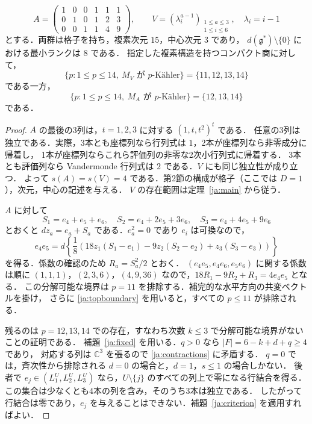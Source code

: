\documentclass[12pt]{amsart}
\theoremstyle{definition}
\theoremstyle{remark}
\numberwithin{equation}{section}
\newcommand{\C}{\mathbb{C}}
\newcommand{\gfr}{\mathfrak g}
\begin{document}
\begin{jprop}\label{ja:counter}
\begin{equation}\label{ja:counterA}
 A=\begin{pmatrix}
 1&0&0&1&1&1\\
 0&1&0&1&2&3\\
 0&0&1&1&4&9
 \end{pmatrix},\qquad
 V=(\lambda_i^{a-1})_{\substack{1\leq a\leq3\\1\leq i\leq6}},
 \quad\lambda_i=i-1
\end{equation}
とする．両群は格子を持ち，複素次元 $15$，中心次元 $3$ であり，
$d(\gfr^*)\setminus\{0\}$ における最小ランクは $8$ である．
指定した複素構造を持つコンパクト商に対して，
\[
 \{p:1\leq p\leq14,\ M_V\text{ が }p\text{-K\"ahler}\}=\{11,12,13,14\}
\]
である一方，
\[
 \{p:1\leq p\leq14,\ M_A\text{ が }p\text{-K\"ahler}\}=\{12,13,14\}
\]
である．
\end{jprop}
\begin{proof}
$A$ の最後の3列は，$t=1,2,3$ に対する $(1,t,t^2)^t$ である．
任意の3列は独立である．実際，3本とも座標列なら行列式は $1$，2本が座標列なら非零成分に帰着し，
1本が座標列ならこれら評価列の非零な2次小行列式に帰着する．
3本とも評価列なら Vandermonde 行列式は $2$ である．$V$ にも同じ独立性が成り立つ．
よって $s(A)=s(V)=4$ である．第2節の構成が格子（ここでは $D=1$），次元，中心の記述を与える．
$V$ の存在範囲は定理~\ref{ja:main} から従う．

$A$ に対して
\[
 S_1=e_4+e_5+e_6,\quad S_2=e_4+2e_5+3e_6,\quad
 S_3=e_4+4e_5+9e_6
\]
とおくと $d z_a=e_a+S_a$ である．$e_a^2=0$ であり $e_i$ は可換なので，
\begin{equation}\label{ja:counterprimitive}
 e_4e_5=d\left\{\frac18\left(
 18z_1(S_1-e_1)-9z_2(S_2-e_2)+z_3(S_3-e_3)\right)\right\}
\end{equation}
を得る．係数の確認のため $R_a=S_a^2/2$ とおく．
$(e_4e_5,e_4e_6,e_5e_6)$ に関する係数は順に
$(1,1,1)$，$(2,3,6)$，$(4,9,36)$ なので，$18R_1-9R_2+R_3=4e_4e_5$ となる．
この分解可能な境界は $p=11$ を排除する．補完的な水平方向の共変ベクトルを掛け，
さらに \eqref{ja:topboundary} を用いると，すべての $p\leq11$ が排除される．

残るのは $p=12,13,14$ での存在，すなわち次数 $k\leq3$ で分解可能な境界がないことの証明である．
補題~\ref{ja:fixed} を用いる．$q>0$ なら $|F|=6-k+d+q\geq4$ であり，
対応する列は $\C^3$ を張るので \eqref{ja:contractions} に矛盾する．
$q=0$ では，斉次性から排除される $d=0$ の場合と，$d=1$，$s\leq1$ の場合しかない．
後者で $e_j\in(L_1^U,L_2^U,L_3^U)$ なら，$U\setminus\{j\}$ のすべての列上で零になる行結合を得る．
この集合は少なくとも4本の列を含み，そのうち3本は独立である．
したがって行結合は零であり，$e_j$ を与えることはできない．補題~\ref{ja:criterion} を適用すればよい．
\end{proof}
\end{document}
